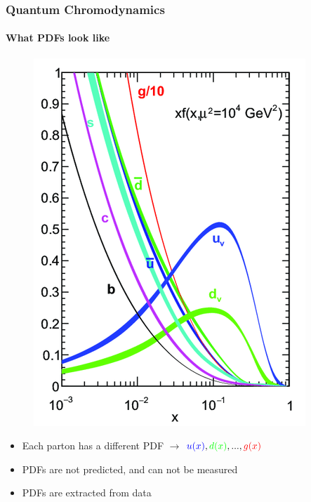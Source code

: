 \documentclass[aspectratio=43]{beamer}
\begin{document}
\begin{frame}

	\frametitle{Quantum Chromodynamics}
	\framesubtitle{What PDFs look like}
	
	\begin{figure}
		\includegraphics[width = 3.8 cm]{PDF.png}
	\end{figure}
	
	\begin{itemize}
		\item Each parton has a different PDF $\longrightarrow$ ${\color{blue}u(x)}, {\color{green}d(x)}, ..., {\color{red}g(x)}$
		\item PDFs are not predicted, and can not be measured
		\item PDFs are {\color{blue}extracted} from data
	\end{itemize}
\end{frame}

\begin{frame}
	

\end{frame}
\end{document}

